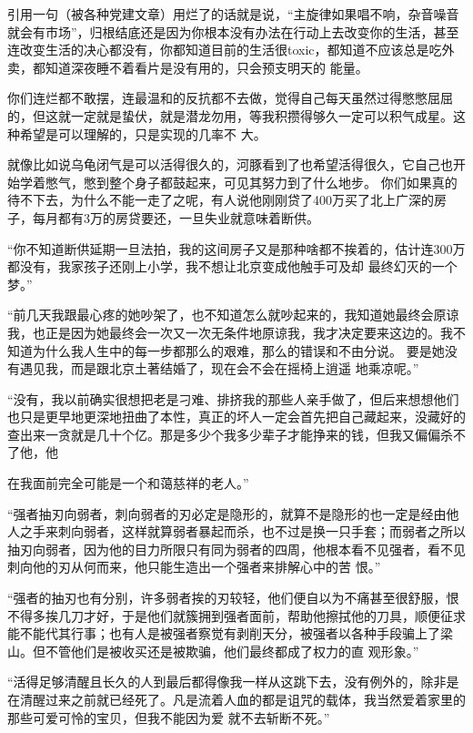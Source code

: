 \documentclass{article}
\begin{document}
引用一句（被各种党建文章）用烂了的话就是说，“主旋律如果唱不响，杂音噪音就会有市场”，归根结底还是因为你根本没有办法在行动上去改变你的生活，甚至连改变生活的决心都没有，你都知道目前的生活很toxic，都知道不应该总是吃外卖，都知道深夜睡不着看片是没有用的，只会预支明天的
能量。   

你们连烂都不敢摆，连最温和的反抗都不去做，觉得自己每天虽然过得憋憋屈屈的，但这就一定就是蛰伏，就是潜龙勿用，等我积攒得够久一定可以积气成星。这种希望是可以理解的，只是实现的几率不
大。   

就像比如说乌龟闭气是可以活得很久的，河豚看到了也希望活得很久，它自己也开始学着憋气，憋到整个身子都鼓起来，可见其努力到了什么地步。 你们如果真的待不下去，为什么不能一走了之呢，有人说他刚刚贷了400万买了北上广深的房子，每月都有3万的房贷要还，一旦失业就意味着断供。  
\newpage

 

“你不知道断供延期一旦法拍，我的这间房子又是那种啥都不挨着的，估计连300万都没有，我家孩子还刚上小学，我不想让北京变成他触手可及却
最终幻灭的一个梦。”   

“前几天我跟最心疼的她吵架了，也不知道怎么就吵起来的，我知道她最终会原谅我，也正是因为她最终会一次又一次无条件地原谅我，我才决定要来这边的。我不知道为什么我人生中的每一步都那么的艰难，那么的错误和不由分说。 要是她没有遇见我，而是跟北京土著结婚了，现在会不会在摇椅上逍遥
地乘凉呢。”   

“没有，我以前确实很想把老是刁难、排挤我的那些人亲手做了，但后来想想他们也只是更早地更深地扭曲了本性，真正的坏人一定会首先把自己藏起来，没藏好的查出来一贪就是几十个亿。那是多少个我多少辈子才能挣来的钱，但我又偏偏杀不了他，他

\newpage
在我面前完全可能是一个和蔼慈祥的老人。”   

“强者抽刃向弱者，刺向弱者的刃必定是隐形的，就算不是隐形的也一定是经由他人之手来刺向弱者，这样就算弱者暴起而杀，也不过是换一只手套；而弱者之所以抽刃向弱者，因为他的目力所限只有同为弱者的四周，他根本看不见强者，看不见刺向他的刃从何而来，他只能生造出一个强者来排解心中的苦
恨。”   

“强者的抽刃也有分别，许多弱者挨的刃较轻，他们便自以为不痛甚至很舒服，恨不得多挨几刀才好，于是他们就簇拥到强者面前，帮助他擦拭他的刀具，顺便征求能不能代其行事；也有人是被强者察觉有剥削天分，被强者以各种手段骗上了梁山。但不管他们是被收买还是被欺骗，他们最终都成了权力的直
观形象。”   

“活得足够清醒且长久的人到最后都得像我一样从这跳下去，没有例外的，除非是在清醒过来之前就已经死了。凡是流着人血的都是诅咒的载体，我当然爱着家里的那些可爱可怜的宝贝，但我不能因为爱
\newpage
就不去斩断不死。”  
\end{document}
